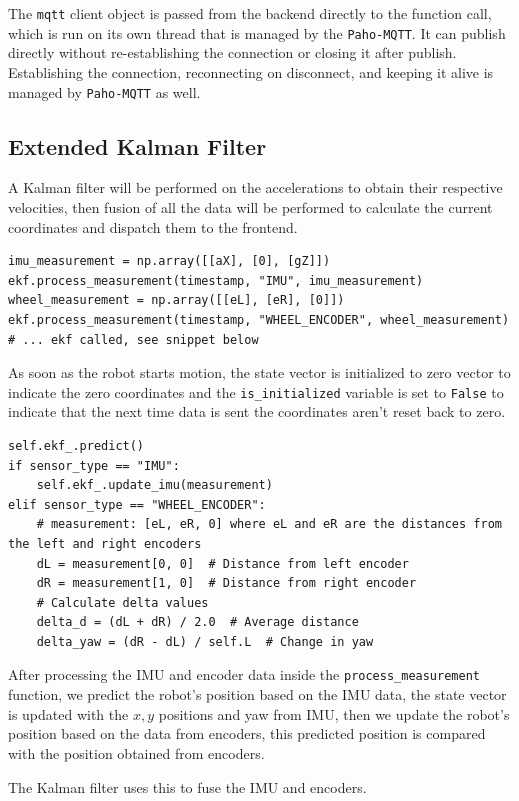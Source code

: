 \documentclass[a4paper,12pt]{article}
\begin{document}
The \texttt{mqtt} client object is passed from the backend directly to the function call, which is run on its own thread that is managed by the \texttt{Paho-MQTT}. It can publish directly without re-establishing the connection or closing it after publish. Establishing the connection, reconnecting on disconnect, and keeping it alive is managed by \texttt{Paho-MQTT} as well.


\subsection{Extended Kalman Filter}
A Kalman filter will be performed on the accelerations to obtain their respective velocities, then fusion of all the data will be performed to calculate the current coordinates and dispatch them to the frontend.

\begin{lstlisting}
imu_measurement = np.array([[aX], [0], [gZ]])
ekf.process_measurement(timestamp, "IMU", imu_measurement)
wheel_measurement = np.array([[eL], [eR], [0]])
ekf.process_measurement(timestamp, "WHEEL_ENCODER", wheel_measurement)
# ... ekf called, see snippet below
\end{lstlisting}
As soon as the robot starts motion, the state vector is initialized to zero vector to indicate the zero coordinates and the \texttt{is\_initialized} variable is set to \texttt{False} to indicate that the next time data is sent the coordinates aren't reset back to zero.

\begin{lstlisting}
self.ekf_.predict()
if sensor_type == "IMU":
    self.ekf_.update_imu(measurement)
elif sensor_type == "WHEEL_ENCODER":
    # measurement: [eL, eR, 0] where eL and eR are the distances from the left and right encoders
    dL = measurement[0, 0]  # Distance from left encoder
    dR = measurement[1, 0]  # Distance from right encoder
    # Calculate delta values
    delta_d = (dL + dR) / 2.0  # Average distance
    delta_yaw = (dR - dL) / self.L  # Change in yaw
\end{lstlisting}

After processing the IMU and encoder data inside the \texttt{process\_measurement} function, we predict the robot's position based on the IMU data, the state vector is updated with the $x , y$ positions and yaw from IMU, then we update the robot's position based on the data from encoders, this predicted position is compared with the position obtained from encoders.

The Kalman filter uses this to fuse the IMU and encoders.
\end{document}
